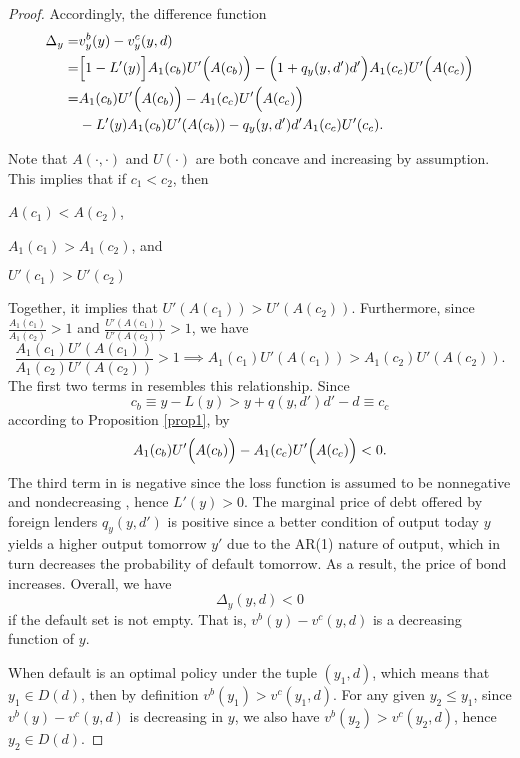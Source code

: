 \begin{proof}
    Accordingly, the difference function
    \begin{align}
        \Delta_y =& v^b_y(y) - v^c_y(y, d) \nonumber \\
        =& \Big[ 1 - L' (y)\Big] A_1 (c_b) U' \Bigl(A(c_b)\Bigr)-
            \Big(1 + q_y(y, d')d'\Big) A_1(c_c) U'\Big(A(c_c)\Big) \nonumber\\
        =& A_1 (c_b) U' \Bigl(A(c_b)\Bigr)-A_1 (c_c) U' \Bigl(A(c_c)\Bigr)  \nonumber \\
        & -L'(y) A_1(c_b)U'(A(c_b)) - q_y(y, d')d'A_1(c_c)U'(c_c). \label{eq:diff-value-function}
    \end{align}

    Note that $A(\cdot, \cdot)$ and $U(\cdot)$ are both concave and increasing by assumption. This implies that if $c_1<c_2$, then
    \begin{enumerate*}[label = (\roman*)]
        \item $A(c_1) < A(c_2)$,
        \item $A_1(c_1) > A_1(c_2)$, and
        \item $U'(c_1) > U'(c_2)$
    \end{enumerate*}
    Together, it implies that $U'(A(c_1)) > U'(A(c_2))$. Furthermore, since $\frac{A_1(c_1)}{A_1(c_2)} > 1$ and $\frac {U'(A(c_1))}{U'(A(c_2))} > 1$, we have
    \begin{equation}
        \label{eq:AUA-compare}
        \frac{A_1(c_1) U'(A(c_1))}{A_1(c_2) U'(A(c_2))} > 1 \implies
        {A_1(c_1) U'(A(c_1))} > {A_1(c_2) U'(A(c_2))}.
    \end{equation}
    The first two terms in  resembles this relationship. Since
    \begin{equation*}
        c_b \equiv y - L(y) > y+q(y, d')d' -d \equiv c_c
    \end{equation*}
    according to Proposition \ref{prop1}, by 
    \begin{equation*}
        A_1 (c_b) U' \Bigl(A(c_b)\Bigr) - A_1 (c_c) U' \Bigl(A(c_c)\Bigr) < 0.
    \end{equation*}
    The third term in  is negative since the loss function is assumed to be nonnegative and nondecreasing \citep{Na-18}, hence $L'(y) > 0$. The marginal price of debt offered by foreign lenders $q_y(y, d')$ is positive since a better condition of output today $y$ yields a higher output tomorrow $y'$ due to the AR(1) nature of output, which in turn decreases the probability of default tomorrow. As a result, the price of bond increases.
    Overall, we have
    \begin{equation*}
        \Delta_y (y, d) < 0
    \end{equation*}
    if the default set is not empty. That is, $v^b(y) - v^c(y, d)$ is a decreasing function of $y$.

    When default is an optimal policy under the tuple $(y_1, d)$, which means that $y_1 \in D(d)$, then by definition $v^b(y_1) > v^c(y_1, d)$. For any given $y_2 \le y_1$, since $v^b(y) - v^c(y, d)$ is decreasing in $y$, we also have $v^b(y_2) > v^c(y_2, d)$, hence $y_2 \in D(d)$.
\end{proof}

